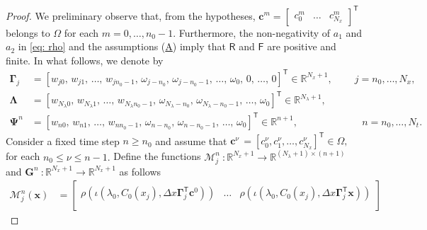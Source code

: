 \documentclass[a4paper, UKenglish, numberwithinsect, thm-restate]{tgdk-v2021}
\begin{document}
\begin{proof}
     We preliminary observe that, from the hypotheses, $\bm{c}^m=\begin{bmatrix}c_0^m & \dots & c_{N_x}^m\end{bmatrix}^\mathsf{T}$ belongs to $\Omega$ for each $m=0,\dots,n_0-1.$ Furthermore, the non-negativity of $a_1$ and $a_2$ in \eqref{eq: rho} and the assumptions (\hyperref[ass:1]{A}) imply that $\mathsf{R}$ and  $\mathsf{F}$ are positive and finite. In what follows, we denote by 
    \begin{equation*}%
        \begin{split}
            \bm{\Gamma}_{j}&=[
            w_{j  0} ,\,  w_{j  1} ,\, \dots ,\, w_{j n_0-1} ,\, \omega_{j-n_0} ,\, \omega_{j-n_0-1} ,\, \dots ,\, \omega_0 ,\, 0 ,\, \dots ,\,  0 
            ]^\mathsf{T} \in \mathbb{R}^{N_x+1}, \qquad \  j=n_0,\dots,N_x, \\
            \bm{\Lambda}&=[
            w_{N_\lambda  0} ,\,  w_{N_\lambda  1} ,\, \dots ,\, w_{N_\lambda  n_0-1} ,\, \omega_{N_\lambda-n_0} ,\, \omega_{N_\lambda-n_0-1} ,\, \dots ,\, \omega_0  
            ]^\mathsf{T} \in \mathbb{R}^{N_\lambda+1}, \\
            \bm{\Psi}^n&=[
            w_{n  0} ,\,  w_{n 1} ,\, \dots ,\, w_{n  n_0-1} ,\, \omega_{n-n_0} ,\, \omega_{n-n_0-1} ,\, \dots ,\, \omega_0
            ]^\mathsf{T} \in \mathbb{R}^{n+1}, \qquad \qquad \qquad \ \ n=n_0,\dots,N_t.
        \end{split}
    \end{equation*}
    Consider a fixed time step $n\geq n_0$ and assume that $\bm{c}^\nu \, =[c_0^\nu , c_1^\nu , \dots , c_{N_x}^\nu]^\mathsf{T}\in \Omega,$ for each $n_0\leq \nu \leq n-1.$ Define the functions 
    $\bm{\mathcal{M}}_{j}^n \ : \mathbb{R}^{N_x + 1} \to \mathbb{R}^{(N_\lambda+1)\times(n+1)}$ and $\bm{G}^n \ : \mathbb{R}^{N_x + 1} \to \mathbb{R}^{N_x + 1}$ as follows
    \begin{equation}\label{eq:Forma_G}
        \begin{split}
             \bm{\mathcal{M}}_{j}^n(\bm{x})&=
             \begin{bmatrix}
                 \rho \! \left(  \iota \! \left(\lambda_0, C_0(x_j) , \Delta x  \bm{\Gamma}_{j}^\mathsf{T}\bm{c}^0 \right) \! \right) & \dots &  \rho \! \left(  \iota \! \left(\lambda_{0}, C_0(x_j) , \Delta x  \bm{\Gamma}_{j}^\mathsf{T}\bm{x} \right) \! \right)  \\

\end{bmatrix}
\end{split}
\end{equation}
\end{proof}
\end{document}
